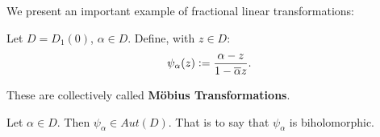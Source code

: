 We present an important example of fractional linear transformations:


\begin{definition}

Let $D = D_1(0)$, $\alpha \in D$. Define, with $z \in D$:
\begin{align*}
    \psi_\alpha (z) \vcentcolon = \frac{\alpha -z}{1 - \overline{\alpha} z}.
\end{align*}

These are collectively called \textbf{M{\"o}bius Transformations}.
\end{definition}
\begin{proposition}
Let $ \alpha \in D$. Then $\psi_\alpha \in Aut (D)$. That is to say that $\psi_\alpha$ is biholomorphic.
\end{proposition}

